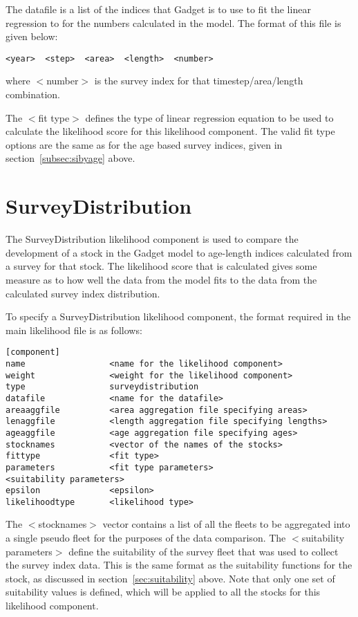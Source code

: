 \documentclass [a4paper, 10pt]{book}
\begin{document}
The datafile is a list of the indices that Gadget is to use to fit the linear regression to for the numbers calculated in the model.  The format of this file is given below:

{\small\begin{verbatim}
<year>  <step>  <area>  <length>  <number>
\end{verbatim}}

where $<$number$>$ is the survey index for that timestep/area/length combination.

\bigskip
The $<$fit type$>$ defines the type of linear regression equation to be used to calculate the likelihood score for this likelihood component.  The valid fit type options are the same as for the age based survey indices, given in section~\ref{subsec:sibyage} above.

\section{SurveyDistribution}\label{sec:surveydistribution}
The SurveyDistribution likelihood component is used to compare the development of a stock in the Gadget model to age-length indices calculated from a survey for that stock.  The likelihood score that is calculated gives some measure as to how well the data from the model fits to the data from the calculated survey index distribution.

\bigskip
To specify a SurveyDistribution likelihood component, the format required in the main likelihood file is as follows:

{\small\begin{verbatim}
[component]
name                 <name for the likelihood component>
weight               <weight for the likelihood component>
type                 surveydistribution
datafile             <name for the datafile>
areaaggfile          <area aggregation file specifying areas>
lenaggfile           <length aggregation file specifying lengths>
ageaggfile           <age aggregation file specifying ages>
stocknames           <vector of the names of the stocks>
fittype              <fit type>
parameters           <fit type parameters>
<suitability parameters>
epsilon              <epsilon>
likelihoodtype       <likelihood type>
\end{verbatim}}

The $<$stocknames$>$ vector contains a list of all the fleets to be aggregated into a single pseudo fleet for the purposes of the data comparison.  The $<$suitability parameters$>$ define the suitability of the survey fleet that was used to collect the survey index data.  This is the same format as the suitability functions for the stock, as discussed in section~\ref{sec:suitability} above.  Note that only one set of suitability values is defined, which will be applied to all the stocks for this likelihood component.
\end{document}
